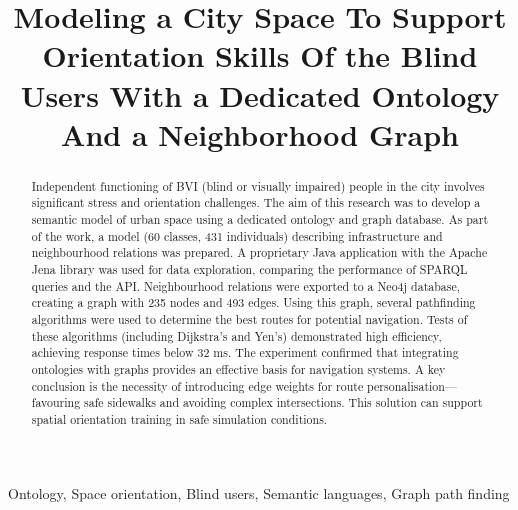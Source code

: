 \documentclass[conference]{IEEEtran}
\begin{document}
\title{Modeling a City Space To Support Orientation Skills Of the Blind Users With a Dedicated Ontology And a Neighborhood Graph}
\author{
\and
{}
}

\maketitle

\begin{abstract}
Independent functioning of BVI (blind or visually impaired) people in the city involves significant stress and orientation challenges. The aim of this research was to develop a semantic model of urban space using a dedicated ontology and graph database. As part of the work, a model (60 classes, 431 individuals) describing infrastructure and neighbourhood relations was prepared. A proprietary Java application with the Apache Jena library was used for data exploration, comparing the performance of SPARQL queries and the API. Neighbourhood relations were exported to a Neo4j database, creating a graph with 235 nodes and 493 edges. Using this graph, several pathfinding algorithms were used to determine the best routes for potential navigation. Tests of these algorithms (including Dijkstra’s and Yen’s) demonstrated high efficiency, achieving response times below 32 ms. The experiment confirmed that integrating ontologies with graphs provides an effective basis for navigation systems. A key conclusion is the necessity of introducing edge weights for route personalisation—favouring safe sidewalks and avoiding complex intersections. This solution can support spatial orientation training in safe simulation conditions.
\end{abstract}

\begin{IEEEkeywords}
Ontology, Space orientation, Blind users, Semantic languages, Graph path finding
\end{IEEEkeywords}
\end{document}
